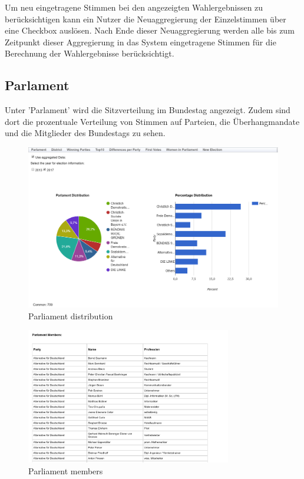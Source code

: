 \documentclass[a4paper]{scrreprt}
\begin{document}
Um neu eingetragene Stimmen bei den angezeigten Wahlergebnissen zu berücksichtigen kann ein Nutzer die Neuaggregierung der Einzelstimmen über eine Checkbox auslösen. Nach Ende dieser Neuaggregierung werden alle bis zum Zeitpunkt dieser Aggregierung in das System eingetragene Stimmen für die Berechnung der Wahlergebnisse berücksichtigt.


\subsection{Parlament}

Unter 'Parlament' wird die Sitzverteilung im Bundestag angezeigt. Zudem sind dort die prozentuale Verteilung von Stimmen auf Parteien,  die Überhangmandate und die Mitglieder des Bundestags zu sehen. 

\begin{figure}[H]
\centering
\includegraphics[width=\textwidth]{images/parliament_distribution.png}
\caption {Parliament distribution}
\end{figure}

\begin{figure}[H]
\centering
\includegraphics[width=0.8\textwidth]{images/parliament_members.png}
\caption {Parliament members}
\end{figure}
\end{document}

